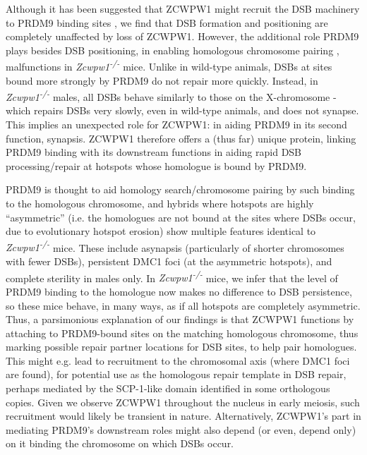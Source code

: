 Although it has been suggested that ZCWPW1 might recruit the DSB machinery to PRDM9 binding sites \parencite{Li2019histone, Spruce2019HELLS}, we find that DSB formation and positioning are completely unaffected by loss of ZCWPW1.
However, the additional role PRDM9 plays besides DSB positioning, in enabling homologous chromosome pairing \parencite{Davies2016Reengineering}, malfunctions in \textit{Zcwpw1\textsuperscript{-/-}} mice.
Unlike in wild-type animals, DSBs at sites bound more strongly by PRDM9 do not repair more quickly.
Instead, in \textit{Zcwpw1\textsuperscript{-/-}} males, all DSBs behave similarly to those on the X-chromosome - which repairs DSBs very slowly, even in wild-type animals, and does not synapse.
This implies an unexpected role for ZCWPW1: in aiding PRDM9 in its second function, synapsis.
ZCWPW1 therefore offers a (thus far) unique protein, linking PRDM9 binding with its downstream functions \parencite{Davies2016Reengineering, Hinch2019Factors, Li2019highresolution} in aiding rapid DSB processing/repair at hotspots whose homologue is bound by PRDM9.

PRDM9 is thought to aid homology search/chromosome pairing by such binding to the homologous chromosome, and hybrids where hotspots are highly “asymmetric” (i.e. the homologues are not bound at the sites where DSBs occur, due to evolutionary hotspot erosion) show multiple features identical to \textit{Zcwpw1\textsuperscript{-/-}} mice.
These include asynapsis (particularly of shorter chromosomes with fewer DSBs), persistent DMC1 foci (at the asymmetric hotspots), and complete sterility in males only.
In \textit{Zcwpw1\textsuperscript{-/-}} mice, we infer that the level of PRDM9 binding to the homologue now makes no difference to DSB persistence, so these mice behave, in many ways, as if all hotspots are completely asymmetric.
Thus, a parsimonious explanation of our findings is that ZCWPW1 functions by attaching to PRDM9-bound sites on the matching homologous chromosome, thus marking possible repair partner locations for DSB sites, to help pair homologues.
This might e.g. lead to recruitment to the chromosomal axis (where DMC1 foci are found), for potential use as the homologous repair template in DSB repair, perhaps mediated by the SCP-1-like domain identified in some orthologous copies.
Given we observe ZCWPW1 throughout the nucleus in early meiosis, such recruitment would likely be transient in nature.
Alternatively, ZCWPW1’s part in mediating PRDM9’s downstream roles might also depend (or even, depend only) on it binding the chromosome on which DSBs occur.

